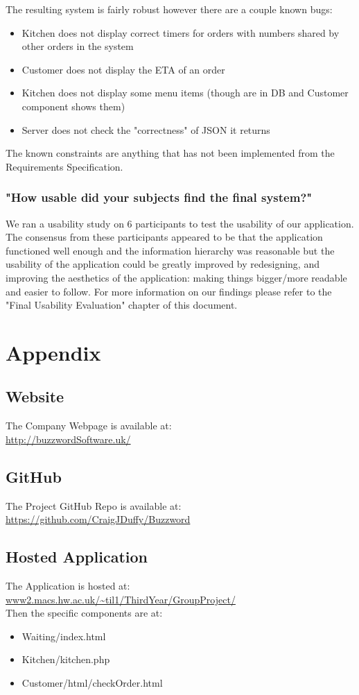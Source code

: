 \documentclass[11pt, oneside, a4paper]{report}   %
\begin{document}
The resulting system is fairly robust however there are a couple known bugs: \\
\begin{itemize}
  \item Kitchen does not display correct timers for orders with numbers shared by other orders in the system
  \item Customer does not display the ETA of an order
  \item Kitchen does not display some menu items (though are in DB and Customer component shows them)
  \item Server does not check the "correctness" of JSON it returns 
\end{itemize}
The known constraints are anything that has not been implemented from the Requirements Specification.

\subsection{"How usable did your subjects find the final system?"}
We ran a usability study on 6 participants to test the usability of our application. The consensus from these participants appeared to be that the application functioned well enough and the information hierarchy was reasonable but the usability of the application could be greatly improved by redesigning, and improving the aesthetics of the application: making things bigger/more readable and easier to follow. For more information on our findings please refer to the "Final Usability Evaluation" chapter of this document.
\chapter{Appendix}
\section{Website}
The Company Webpage is available at: \\
\url{http://buzzwordSoftware.uk/}
\section{GitHub}
The Project GitHub Repo is available at: \\
\url{https://github.com/CraigJDuffy/Buzzword}
\section{Hosted Application}
The Application is hosted at: \\ 
\url{www2.macs.hw.ac.uk/~til1/ThirdYear/GroupProject/}\\
Then the specific components are at: \
\begin{itemize}
\item Waiting/index.html
\item Kitchen/kitchen.php
\item Customer/html/checkOrder.html
\end{itemize}
\end{document}
